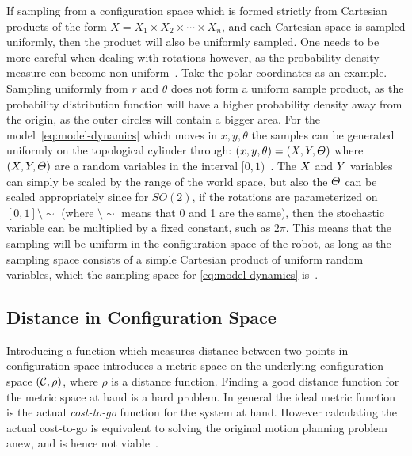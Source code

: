 If sampling from a configuration space which is formed strictly from Cartesian
products of the form \(X = X_1\times X_2\times \cdots \times X_n\), and each
Cartesian space is sampled uniformly, then the product will also be uniformly
sampled. One needs to be more careful when dealing with rotations however, as
the probability density measure can become non-uniform~\cite{Lav06}. Take the
polar coordinates as an example. Sampling uniformly from \(r\) and \(\theta\)
does not form a uniform sample product, as the probability distribution function
will have a higher probability density away from the origin, as the outer
circles will contain a bigger area. For the model~\cref{eq:model-dynamics} which
moves in \(x,y,\theta\) the samples can be generated uniformly on the
topological cylinder through: \( (x,y,\theta) = (\mathnormal{X}, \mathnormal{Y},
\mathnormal{\Theta}) \) where \((\mathnormal{X}, \mathnormal{Y},
\mathnormal{\Theta})\) are a random variables in the interval
\([0,1)\)~\cite{kuffnerEffectiveSamplingDistance2004}. The \(\mathnormal{X}\)
and \(\mathnormal{Y}\) variables can simply be scaled by the range of the world
space, but also the \(\mathnormal{\Theta}\) can be scaled appropriately since
for \(SO(2)\), if the rotations are parameterized on \([0,1]\setminus\sim\)
(where \(\setminus\sim\) means that 0 and 1 are the same), then the stochastic
variable can be multiplied by a fixed constant, such as \(2\pi\). This means
that the sampling will be uniform in the configuration space of the robot, as
long as the sampling space consists of a simple Cartesian product of uniform
random variables, which the sampling space for \cref{eq:model-dynamics}
is~\cite{Lav06}.

\subsection{Distance in Configuration Space}

Introducing a function which measures distance between two points in
configuration space introduces a metric space on the underlying configuration
space \((\mathcal{C}{},\rho)\), where \(\rho\) is a distance
function. Finding a good distance function for the metric space at hand is a
hard problem. In general the ideal metric function is the actual
\textit{cost-to-go} function for the system at hand. However calculating the
actual cost-to-go is equivalent to solving the original motion planning problem
anew, and is hence not viable~\cite{pengchengReducingMetricSensitivity2001}.

